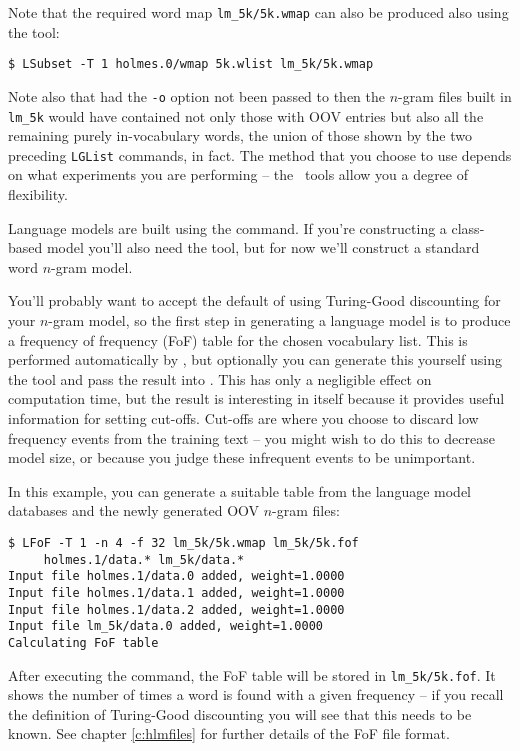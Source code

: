 Note that the required word map \texttt{lm\_5k/5k.wmap} can also be
produced also using the  tool:
\begin{verbatim}
$ LSubset -T 1 holmes.0/wmap 5k.wlist lm_5k/5k.wmap
\end{verbatim} %

Note also that had the {\tt -o} option not been passed to
 then the $n$-gram files built in {\tt lm\_5k} would have
contained not only those with OOV entries but also all the remaining
purely in-vocabulary words, the union of those shown by the two
preceding {\tt LGList} commands, in fact.  The method that you choose
to use depends on what experiments you are performing -- the \HTK\
tools allow you a degree of flexibility.


Language models are built using the  command.  If you're
constructing a class-based model you'll also need the \htool{Cluster}
tool, but for now we'll construct a standard word $n$-gram model.

You'll probably want to accept the default of using Turing-Good
discounting for your $n$-gram model, so the first step in generating a
language model is to produce a frequency of frequency (FoF) table for
the chosen vocabulary list.  This is performed automatically by
, but optionally you can generate this yourself using
the \htool{LFoF} tool and pass the result into \htool{LBuild}.  This
has only a negligible effect on computation time, but the result is
interesting in itself because it provides useful information for
setting cut-offs.  Cut-offs are where you choose to discard low
frequency events from the training text -- you might wish to do this
to decrease model size, or because you judge these infrequent events
to be unimportant.

In this example, you can generate a suitable table from the language
model databases and the newly generated OOV $n$-gram files:
\begin{verbatim}
$ LFoF -T 1 -n 4 -f 32 lm_5k/5k.wmap lm_5k/5k.fof
     holmes.1/data.* lm_5k/data.*
Input file holmes.1/data.0 added, weight=1.0000
Input file holmes.1/data.1 added, weight=1.0000
Input file holmes.1/data.2 added, weight=1.0000
Input file lm_5k/data.0 added, weight=1.0000
Calculating FoF table
\end{verbatim} %

After executing the command, the FoF table will be stored in
\texttt{lm\_5k/5k.fof}.  It shows the number of times a word is found
with a given frequency -- if you recall the definition of Turing-Good
discounting you will see that this needs to be known.  See chapter
\ref{c:hlmfiles} for further details of the FoF file format.

